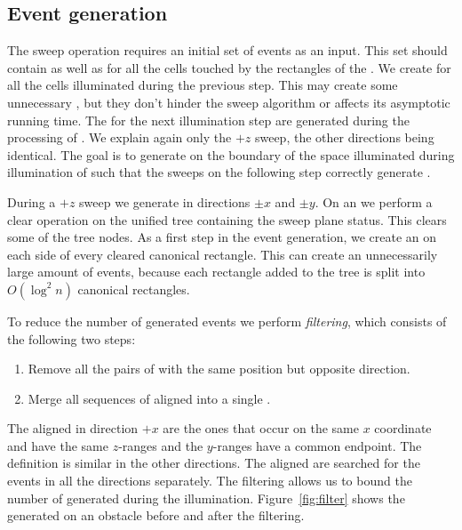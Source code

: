 \documentclass[english,gradu]{tktltiki2018}
\begin{document}
\subsection{Event generation}\label{sec:evtgen}

The sweep operation requires an initial set of events as an input.
This set should contain \addEs as well as \cellEs for all the cells touched by the rectangles of the \addEs.
We create \cellEs for all the cells illuminated during the previous step.
This may create some unnecessary \cellEs, but they don't hinder the sweep algorithm or affects its asymptotic running time.
The \addEs for the next illumination step are generated during the processing of \obsEs.
We explain again only the $+z$ sweep, the other directions being identical.
The goal is to generate \addEs on the boundary of the space illuminated during illumination of  such that the sweeps on the following step correctly generate .

During a $+z$ sweep we generate \addEs in directions $\pm x$ and $\pm y$.
On an \obsE we perform a clear operation on the unified tree containing the sweep plane status.
This clears some of the tree nodes.
As a first step in the event generation, we create an \addE on each side of every cleared canonical rectangle.
This can create an unnecessarily large amount of events, because each rectangle added to the tree is split into $O(\log^2 n)$ canonical rectangles.

To reduce the number of generated events we perform \emph{filtering}, which consists of the following two steps:
\begin{enumerate}
\item Remove all the pairs of \addEs with the same position but opposite direction.
\item Merge all sequences of aligned \addEs into a single \addE.
\end{enumerate}

The aligned \addEs in direction $+x$ are the ones that occur on the same $x$ coordinate and have the same $z$-ranges and the $y$-ranges have a common endpoint.
The definition is similar in the other directions.
The aligned \addEs are searched for the events in all the directions separately.
The filtering allows us to bound the number of \addEs generated during the illumination.
Figure~\ref{fig:filter} shows the generated \addEs on an obstacle before and after the filtering.
\end{document}
